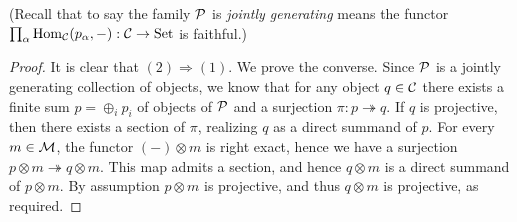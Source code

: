 \documentclass{amsart}
\begin{document}
\noindent (Recall that to say the family $\mathcal P$ is {\em jointly generating} means the functor $\prod_\alpha \operatorname{Hom}_\mathcal C(p_\alpha, -): \mathcal C \to \mathrm{Set}$ is faithful.) 

\begin{proof}
	It is clear that $(2) \Rightarrow (1)$.  We prove the converse. Since $\mathcal P$ is a jointly generating collection of objects, we know that for any object $q \in \mathcal C$ there exists a finite sum $p = \oplus_i p_i$ of objects of $\mathcal P$ and a surjection $\pi:p \twoheadrightarrow q$. If $q$ is projective, then there exists a section of $\pi$, realizing $q$ as a direct summand of $p$. For every $m \in \mathcal M$, the functor $(-)\otimes m$ is right exact, hence we have a surjection $p \otimes m \twoheadrightarrow q \otimes m$. This map admits a section, and hence $q \otimes m$ is a direct summand of $p \otimes m$. By assumption $p \otimes m$ is projective, and thus $q \otimes m$ is projective, as required.
\end{proof}
\end{document}
